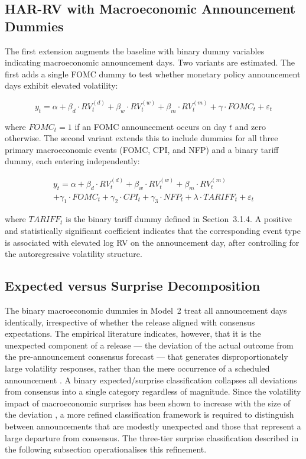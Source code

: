 \documentclass[12pt,a4paper]{report}
\begin{document}
\subsection{HAR-RV with Macroeconomic Announcement Dummies}
The first extension augments the baseline with binary dummy variables indicating macroeconomic announcement days. Two variants are estimated. The first adds a single FOMC dummy to test whether monetary policy announcement days exhibit elevated volatility:

\begin{equation}
y_t = \alpha + \beta_d \cdot RV_t^{(d)} + \beta_w \cdot RV_t^{(w)} + \beta_m \cdot RV_t^{(m)} + \gamma \cdot FOMC_t + \varepsilon_t
\end{equation}

\noindent where $FOMC_t = 1$ if an FOMC announcement occurs on day $t$ and zero otherwise. The second variant extends this to include dummies for all three primary macroeconomic events (FOMC, CPI, and NFP) and a binary tariff dummy, each entering independently:

\begin{equation}
\begin{split}
y_t = \alpha + \beta_d \cdot RV_t^{(d)} + \beta_w \cdot RV_t^{(w)} + \beta_m \cdot RV_t^{(m)} \\
+ \gamma_1 \cdot FOMC_t + \gamma_2 \cdot CPI_t + \gamma_3 \cdot NFP_t + \lambda \cdot TARIFF_t + \varepsilon_t
\end{split}
\end{equation}

\noindent where $TARIFF_t$ is the binary tariff dummy defined in Section~3.1.4. A positive and statistically significant coefficient indicates that the corresponding event type is associated with elevated log RV on the announcement day, after controlling for the autoregressive volatility structure.

\subsection{Expected versus Surprise Decomposition}
The binary macroeconomic dummies in Model~2 treat all announcement days identically, irrespective of whether the release aligned with consensus expectations. The empirical literature indicates, however, that it is the unexpected component of a release --- the deviation of the actual outcome from the pre-announcement consensus forecast --- that generates disproportionately large volatility responses, rather than the mere occurrence of a scheduled announcement \citep{Gilbert2017}. A binary expected/surprise classification collapses all deviations from consensus into a single category regardless of magnitude. Since the volatility impact of macroeconomic surprises has been shown to increase with the size of the deviation \citep{Balduzzi2001}, a more refined classification framework is required to distinguish between announcements that are modestly unexpected and those that represent a large departure from consensus. The three-tier surprise classification described in the following subsection operationalises this refinement.
\end{document}
